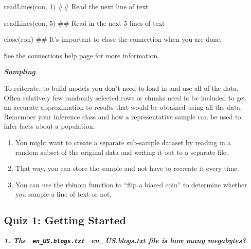 \documentclass[
]{article}
\newenvironment{Shaded}{\begin{snugshade}}{\end{snugshade}}
\newcommand{\DecValTok}[1]{\textcolor[rgb]{0.00,0.00,0.81}{#1}}
\newcommand{\KeywordTok}[1]{\textcolor[rgb]{0.13,0.29,0.53}{\textbf{#1}}}
\newcommand{\NormalTok}[1]{#1}
\newcommand{\OperatorTok}[1]{\textcolor[rgb]{0.81,0.36,0.00}{\textbf{#1}}}
\newcommand{\StringTok}[1]{\textcolor[rgb]{0.31,0.60,0.02}{#1}}
\providecommand{\tightlist}{%
  \setlength{\itemsep}{0pt}\setlength{\parskip}{0pt}}
\begin{document}
readLines(con, 1) \#\# Read the next line of text

readLines(con, 5) \#\# Read in the next 5 lines of text

close(con) \#\# It's important to close the connection when you are
done.

See the connections help page for more information.

\textbf{\emph{Sampling}}.

To reiterate, to build models you don't need to load in and use all of
the data. Often relatively few randomly selected rows or chunks need to
be included to get an accurate approximation to results that would be
obtained using all the data. Remember your inference class and how a
representative sample can be used to infer facts about a population.

\begin{enumerate}
\def\labelenumi{\alph{enumi}.}
\tightlist
\item
  You might want to create a separate sub-sample dataset by reading in a
  random subset of the original data and writing it out to a separate
  file.
\item
  That way, you can store the sample and not have to recreate it every
  time.
\item
  You can use the rbinom function to ``flip a biased coin'' to determine
  whether you sample a line of text or not.
\end{enumerate}

\hypertarget{quiz-1-getting-started}{%
\subsection{Quiz 1: Getting Started}\label{quiz-1-getting-started}}

\textbf{\emph{1. The \verb| en_US.blogs.txt | en\_US.blogs.txt file is
how many megabytes?}}

\begin{Shaded}
\end{Shaded}
\end{document}
